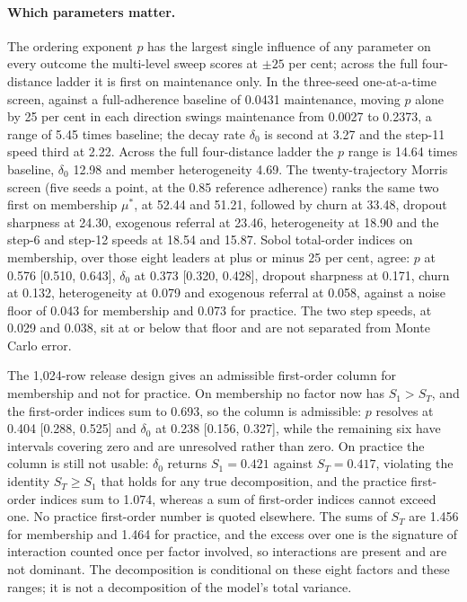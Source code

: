 \documentclass[11pt,a4paper]{article}
\begin{document}
\paragraph{Which parameters matter.} The ordering exponent $p$ has the largest
single influence of any parameter on every outcome the multi-level sweep scores at
$\pm 25$ per cent; across the full four-distance ladder it is first on maintenance only.
In the three-seed one-at-a-time screen, against a full-adherence baseline of 0.0431
maintenance, moving $p$ alone by 25 per
cent in each direction swings maintenance from 0.0027 to 0.2373, a range of 5.45
times baseline; the decay rate $\delta_0$ is second at 3.27 and the step-11 speed
third at 2.22. Across the full four-distance ladder the $p$ range is 14.64 times
baseline, $\delta_0$ 12.98 and member heterogeneity 4.69. The twenty-trajectory
Morris screen (five seeds a point, at the 0.85 reference adherence) ranks the same two first on membership $\mu^*$, at 52.44 and 51.21,
followed by churn at 33.48, dropout sharpness at 24.30, exogenous referral at
23.46, heterogeneity at 18.90 and the step-6 and step-12 speeds at 18.54 and 15.87.
Sobol total-order indices on membership, over those eight leaders at plus or minus
25 per cent, agree: $p$ at 0.576 [0.510, 0.643], $\delta_0$ at 0.373 [0.320, 0.428],
dropout sharpness at 0.171, churn at 0.132, heterogeneity at 0.079 and exogenous
referral at 0.058, against a noise floor of 0.043 for membership and 0.073 for
practice. The two step speeds, at 0.029 and 0.038, sit at or below that floor and
are not separated from Monte Carlo error.

The 1,024-row release design gives an admissible first-order column for membership
and not for practice. On membership no factor now has $S_1 > S_T$,
and the first-order indices sum to 0.693, so the column is admissible: $p$ resolves
at 0.404 [0.288, 0.525] and $\delta_0$ at 0.238 [0.156, 0.327], while the remaining
six have intervals covering zero and are unresolved rather than zero. On practice
the column is still not usable: $\delta_0$ returns $S_1 = 0.421$ against
$S_T = 0.417$, violating the identity $S_T \ge S_1$ that holds for any true
decomposition, and the practice first-order indices sum to 1.074, whereas a sum of
first-order indices cannot exceed one. No practice first-order number is quoted
elsewhere. The sums of $S_T$ are 1.456 for membership and 1.464 for practice, and
the excess over one is the signature of interaction counted once per factor
involved, so interactions are present and are not dominant. The decomposition is
conditional on these eight factors and these ranges; it is not a decomposition of
the model's total variance.
\end{document}
